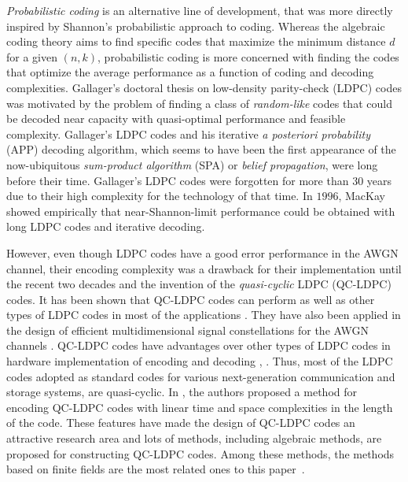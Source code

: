 \documentclass[journal,draftclsnofoot,onecolumn,12pt,twoside]{IEEEtran}
\begin{document}
\emph{Probabilistic coding} is  an alternative line of development, that was more directly inspired by Shannon's
probabilistic approach to coding. Whereas the algebraic coding theory aims to find specific codes that maximize the
minimum distance $d$ for a given $(n,k)$, probabilistic coding is more concerned with finding the codes that optimize the average performance as a function of coding and decoding complexities. Gallager's doctoral thesis \cite{05} on low-density parity-check (LDPC) codes was motivated by the problem of finding a class of \emph{random-like} codes that could be decoded near capacity with quasi-optimal performance and feasible complexity. Gallager's LDPC codes and his iterative  \emph{a posteriori probability} (APP) decoding algorithm, which seems to have been the first appearance of the now-ubiquitous \emph{sum-product algorithm} (SPA) or \emph{belief propagation}, were long before their time.  Gallager's LDPC codes were forgotten for more than $30$ years due to their high complexity for the technology of that time.
In $1996$, MacKay \cite{06} showed empirically that near-Shannon-limit performance could be obtained with long LDPC codes and iterative decoding.

However, even though LDPC codes have a good error performance in the AWGN channel, their encoding complexity was a drawback for their implementation until the recent two decades and the invention of the \emph{quasi-cyclic} LDPC (QC-LDPC) codes. It has been shown that QC-LDPC codes can perform as well as other types of LDPC codes in most of the applications \cite{5,6,7,8,9,10,11,12}. They have also been applied in the design of efficient multidimensional signal constellations for the AWGN channels \cite{mypaper1,mypaper2}.
QC-LDPC codes have advantages over other types of LDPC codes in hardware implementation of encoding \cite{4} and decoding \cite{6}, \cite{12}. Thus, most of the LDPC codes adopted as standard codes for
various next-generation communication and storage systems, are quasi-cyclic.
In \cite{4}, the authors proposed a method for encoding QC-LDPC codes with linear time and space complexities in the length of the code.
These features have made the design of QC-LDPC codes an attractive research area and lots of methods, including algebraic methods, are proposed for constructing QC-LDPC codes. Among these methods, the methods based on finite fields are the most related ones to this paper~\cite{12,3,QC_cyclic}.
\end{document}
